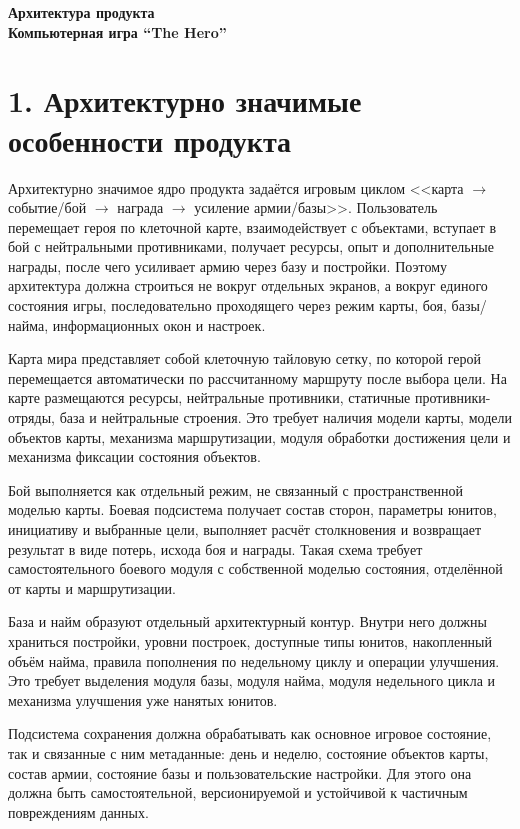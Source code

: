 \documentclass[12pt,a4paper]{article}
\begin{document}
\begin{center}
    \textbf{\Large Архитектура продукта}\\[0.5em]
    \textbf{\large Компьютерная игра ``The Hero''}
\end{center}


\section*{1. Архитектурно значимые особенности продукта}

Архитектурно значимое ядро продукта задаётся игровым циклом <<карта $\rightarrow$ событие/бой $\rightarrow$ награда $\rightarrow$ усиление армии/базы>>. Пользователь перемещает героя по клеточной карте, взаимодействует с объектами, вступает в бой с нейтральными противниками, получает ресурсы, опыт и дополнительные награды, после чего усиливает армию через базу и постройки. Поэтому архитектура должна строиться не вокруг отдельных экранов, а вокруг единого состояния игры, последовательно проходящего через режим карты, боя, базы/найма, информационных окон и настроек.

Карта мира представляет собой клеточную тайловую сетку, по которой герой перемещается автоматически по рассчитанному маршруту после выбора цели. На карте размещаются ресурсы, нейтральные противники, статичные противники-отряды, база и нейтральные строения. Это требует наличия модели карты, модели объектов карты, механизма маршрутизации, модуля обработки достижения цели и механизма фиксации состояния объектов.

Бой выполняется как отдельный режим, не связанный с пространственной моделью карты. Боевая подсистема получает состав сторон, параметры юнитов, инициативу и выбранные цели, выполняет расчёт столкновения и возвращает результат в виде потерь, исхода боя и награды. Такая схема требует самостоятельного боевого модуля с собственной моделью состояния, отделённой от карты и маршрутизации.

База и найм образуют отдельный архитектурный контур. Внутри него должны храниться постройки, уровни построек, доступные типы юнитов, накопленный объём найма, правила пополнения по недельному циклу и операции улучшения. Это требует выделения модуля базы, модуля найма, модуля недельного цикла и механизма улучшения уже нанятых юнитов.

Подсистема сохранения должна обрабатывать как основное игровое состояние, так и связанные с ним метаданные: день и неделю, состояние объектов карты, состав армии, состояние базы и пользовательские настройки. Для этого она должна быть самостоятельной, версионируемой и устойчивой к частичным повреждениям данных.
\end{document}
